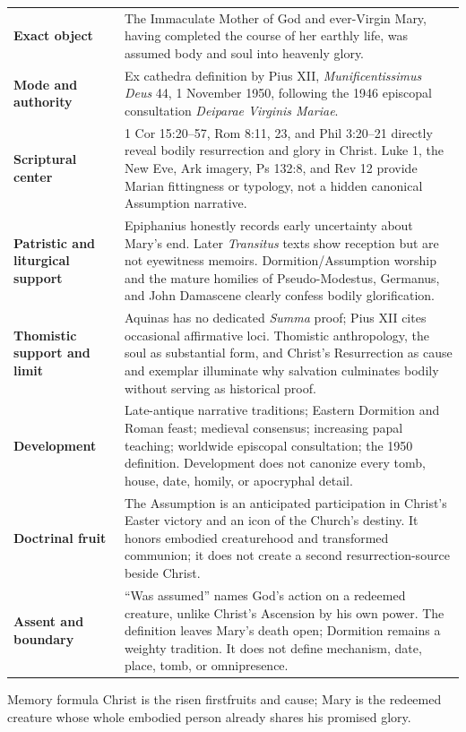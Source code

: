 \begingroup
\footnotesize
\renewcommand{\arraystretch}{1.10}
\begin{tabularx}{\textwidth}{@{}>{\raggedright\arraybackslash\bfseries}p{}X@{}}
\toprule
Exact object & The Immaculate Mother of God and ever-Virgin Mary, having completed the course of her earthly life, was assumed body and soul into heavenly glory.\\
Mode and authority & Ex cathedra definition by Pius XII, \emph{Munificentissimus Deus} 44, 1 November 1950, following the 1946 episcopal consultation \emph{Deiparae Virginis Mariae}.\\
Scriptural center & 1 Cor 15:20--57, Rom 8:11, 23, and Phil 3:20--21 directly reveal bodily resurrection and glory in Christ. Luke 1, the New Eve, Ark imagery, Ps 132:8, and Rev 12 provide Marian fittingness or typology, not a hidden canonical Assumption narrative.\\
Patristic and liturgical support & Epiphanius honestly records early uncertainty about Mary's end. Later \emph{Transitus} texts show reception but are not eyewitness memoirs. Dormition/Assumption worship and the mature homilies of Pseudo-Modestus, Germanus, and John Damascene clearly confess bodily glorification.\\
Thomistic support and limit & Aquinas has no dedicated \emph{Summa} proof; Pius XII cites occasional affirmative loci. Thomistic anthropology, the soul as substantial form, and Christ's Resurrection as cause and exemplar illuminate why salvation culminates bodily without serving as historical proof.\\
Development & Late-antique narrative traditions; Eastern Dormition and Roman feast; medieval consensus; increasing papal teaching; worldwide episcopal consultation; the 1950 definition. Development does not canonize every tomb, house, date, homily, or apocryphal detail.\\
Doctrinal fruit & The Assumption is an anticipated participation in Christ's Easter victory and an icon of the Church's destiny. It honors embodied creaturehood and transformed communion; it does not create a second resurrection-source beside Christ.\\
Assent and boundary & “Was assumed” names God's action on a redeemed creature, unlike Christ's Ascension by his own power. The definition leaves Mary's death open; Dormition remains a weighty tradition. It does not define mechanism, date, place, tomb, or omnipresence.\\
\bottomrule
\end{tabularx}

\begin{studybox}{Memory formula}
Christ is the risen firstfruits and cause; Mary is the redeemed creature whose whole embodied person already shares his promised glory.
\end{studybox}
\endgroup
\clearpage
